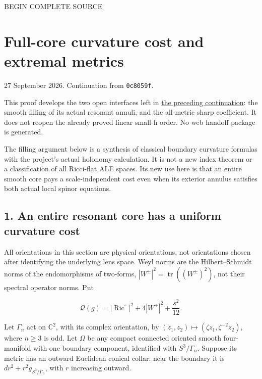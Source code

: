 \documentclass[
  10pt,
]{article}
\begin{document}
BEGIN COMPLETE SOURCE

\hypertarget{full-core-curvature-cost-and-extremal-metrics}{%
\section{Full-core curvature cost and extremal
metrics}\label{full-core-curvature-cost-and-extremal-metrics}}

27 September 2026. Continuation from \texttt{0c8059f}.

This proof develops the two open interfaces left in
\href{20260927_local_geometry_and_variational_extrema.md}{the preceding
continuation}: the smooth filling of its actual resonant annuli, and the
all-metric sharp coefficient. It does not reopen the already proved
linear small-h order. No web handoff package is generated.

The filling argument below is a synthesis of classical boundary
curvature formulas with the project's actual holonomy calculation. It is
not a new index theorem or a classification of all Ricci-flat ALE
spaces. Its new use here is that an entire smooth core pays a
scale-independent cost even when its exterior annulus satisfies both
actual local spinor equations.

\hypertarget{an-entire-resonant-core-has-a-uniform-curvature-cost}{%
\subsection{1. An entire resonant core has a uniform curvature
cost}\label{an-entire-resonant-core-has-a-uniform-curvature-cost}}

All orientations in this section are physical orientations, not
orientations chosen after identifying the underlying lens space. Weyl
norms are the Hilbert--Schmidt norms of the endomorphisms of two-forms,
\(|W^\pm|^2=\operatorname{tr}((W^\pm)^2)\), not their spectral operator
norms. Put

\[
 \mathscr Q(g)=|\operatorname{Ric}^{\circ}|^2
                       +4|W^+|^2+\frac{s^2}{12}.
                                                        \tag{1.1}
\]

Let \(\Gamma_n\) act on \(\mathbb C^2\), with its complex orientation,
by \((z_1,z_2)\mapsto(\zeta z_1,\zeta^{-2}z_2)\), where \(n\ge3\) is
odd. Let \(\Omega\) be any compact connected oriented smooth
four-manifold with one boundary component, identified with
\(S^3/\Gamma_n\). Suppose its metric has an outward Euclidean conical
collar: near the boundary it is \(dr^2+r^2g_{S^3/\Gamma_n}\), with \(r\)
increasing outward.
\end{document}
